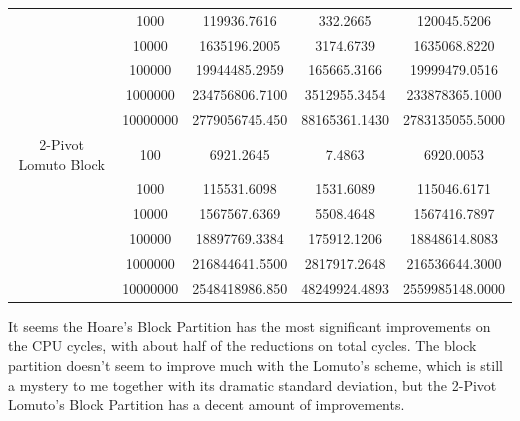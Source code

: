 \documentclass{article}
\begin{document}
\begin{center}
\begin{tabular}{ |c c | c c c| }
                        & 1000     & 119936.7616    & 332.2665      & 120045.5206 \\
                        & 10000    & 1635196.2005   & 3174.6739     & 1635068.8220 \\
                        & 100000   & 19944485.2959  & 165665.3166   & 19999479.0516 \\
                        & 1000000  & 234756806.7100 & 3512955.3454  & 233878365.1000 \\
                        & 10000000 & 2779056745.450 & 88165361.1430 & 2783135055.5000 \\
   2-Pivot Lomuto Block & 100      & 6921.2645      & 7.4863        & 6920.0053 \\
                        & 1000     & 115531.6098    & 1531.6089     & 115046.6171 \\
                        & 10000    & 1567567.6369   & 5508.4648     & 1567416.7897 \\
                        & 100000   & 18897769.3384  & 175912.1206   & 18848614.8083 \\
                        & 1000000  & 216844641.5500 & 2817917.2648  & 216536644.3000 \\
                        & 10000000 & 2548418986.850 & 48249924.4893 & 2559985148.0000 \\
        \hline
    \end{tabular}
\end{center}

It seems the Hoare's Block Partition has the most significant improvements on the CPU cycles, with about half of the reductions on total cycles.
The block partition doesn't seem to improve much with the Lomuto's scheme, which is still a mystery to me together with its dramatic standard deviation, but the 2-Pivot Lomuto's Block Partition has a decent amount of improvements.
\end{document}
